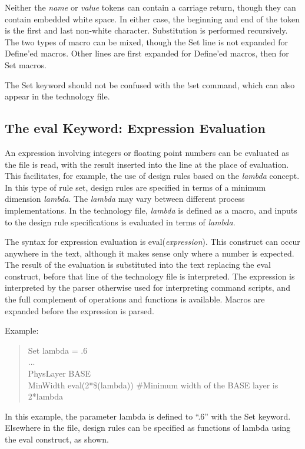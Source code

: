 Neither the {\it name\/} or {\it value\/} tokens can contain a
carriage return, though they can contain embedded white space.  In
either case, the beginning and end of the token is the first and last
non-white character.  Substitution is performed recursively.  The two
types of macro can be mixed, though the {\vt Set} line is not expanded
for {\vt Define}'ed macros.  Other lines are first expanded for {\vt
Define}'ed macros, then for {\vt Set} macros.

The {\vt Set} keyword should not be confused with the {\cb !set}
command, which can also appear in the technology file.

\subsection{The {\vt eval} Keyword: Expression Evaluation}

An expression involving integers or floating point numbers can be
evaluated as the file is read, with the result inserted into the line
at the place of evaluation.  This facilitates, for example, the use of
design rules based on the {\it lambda} concept.  In this type of rule
set, design rules are specified in terms of a minimum dimension {\it
lambda\/}.  The {\it lambda\/} may vary between different process
implementations.  In the technology file, {\it lambda\/} is defined as
a macro, and inputs to the design rule specifications is evaluated in
terms of {\it lambda\/}.

The syntax for expression evaluation is {\vt eval({\it expression\/})}. 
This construct can occur anywhere in the text, although it makes sense
only where a number is expected.  The result of the evaluation is
substituted into the text replacing the {\vt eval} construct, before
that line of the technology file is interpreted.  The expression is
interpreted by the parser otherwise used for interpreting command
scripts, and the full complement of operations and functions is
available.  Macros are expanded before the expression is parsed.

Example:
\begin{quote}\vt
Set lambda = .6\\
...\\
PhysLayer BASE\\
MinWidth eval(2*\$(lambda))  \#Minimum width of the BASE layer is 2*lambda
\end{quote}

In this example, the parameter {\vt lambda} is defined to ``.6'' with
the {\vt Set} keyword.  Elsewhere in the file, design rules can be
specified as functions of {\vt lambda} using the {\vt eval} construct,
as shown.

